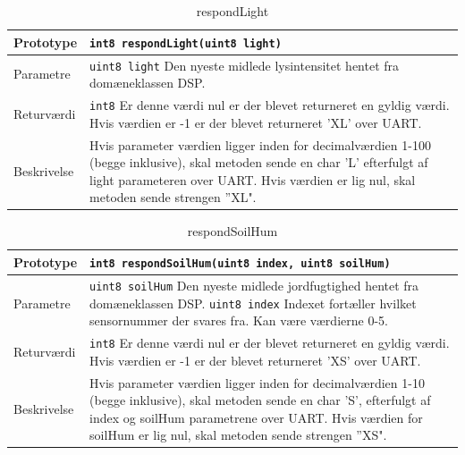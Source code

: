 
\begin{table}[h]
\begin{tabularx}{\textwidth}{| >{\raggedright\arraybackslash}p{2.5 cm} | >{\raggedright\arraybackslash}X |} \hline
Prototype & \texttt{int8 respondLight(uint8 light)} \\\hline
Parametre & \texttt{uint8 light} \newline
Den nyeste midlede lysintensitet hentet fra domæneklassen DSP. 
 \\\hline
Returværdi & \texttt{int8} \newline
Er denne værdi nul er der blevet returneret en gyldig værdi. Hvis værdien er -1 er der blevet returneret ’XL’ over UART.\\\hline
Beskrivelse & Hvis parameter værdien ligger inden for decimalværdien 1-100 (begge inklusive), skal metoden sende en char ’L’ efterfulgt af light parameteren over UART. Hvis værdien er lig nul, skal metoden sende strengen ”XL".     \\\hline
\end{tabularx}
\caption{respondLight}
\label{table:respondLight}
\end{table}


\begin{table}[h]
\begin{tabularx}{\textwidth}{| >{\raggedright\arraybackslash}p{2.5 cm} | >{\raggedright\arraybackslash}X |} \hline
Prototype & \texttt{int8 respondSoilHum(uint8 index, uint8 soilHum)} \\\hline
Parametre & \texttt{uint8 soilHum} \newline
Den nyeste midlede jordfugtighed hentet fra domæneklassen DSP. \newline
\texttt{uint8 index} \newline
Indexet fortæller hvilket sensornummer der svares fra. Kan være værdierne 0-5. \\\hline
Returværdi & \texttt{int8} \newline
Er denne værdi nul er der blevet returneret en gyldig værdi. Hvis værdien er -1 er der blevet returneret ’XS’ over UART.\\\hline
Beskrivelse & Hvis parameter værdien ligger inden for decimalværdien 1-10 (begge inklusive), skal metoden sende en char ’S’, efterfulgt af index og soilHum parametrene over UART. Hvis værdien for soilHum er lig nul, skal metoden sende strengen ”XS". \\\hline
\end{tabularx}
\caption{respondSoilHum}
\label{table:respondSoilHum}
\end{table}

